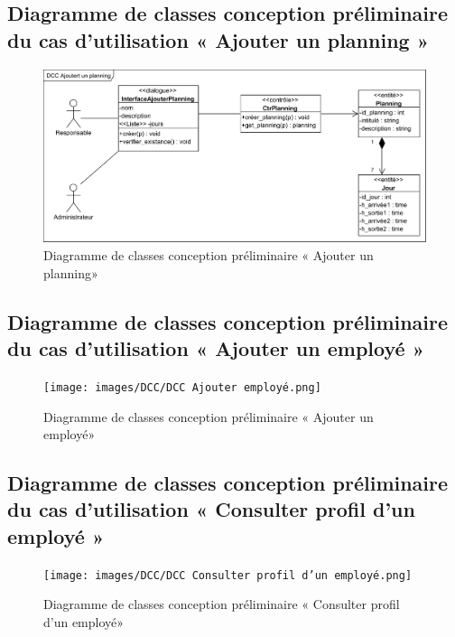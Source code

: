 \begin{itemize}
        \subsection*{Diagramme de classes conception préliminaire du cas d'utilisation « Ajouter un planning »}
        \begin{figure}[h!]
                 \centering
                \includegraphics[scale=0.7]{images/DCC/DCC Ajoutert un planning.png}
                 \caption{Diagramme de classes conception préliminaire « Ajouter un planning»}
                 \label{fig44}
        \end{figure}
        
        \clearpage



        \subsection*{Diagramme de classes conception préliminaire du cas d'utilisation « Ajouter un employé »}
        \begin{figure}[h!]
                 \centering
                \texttt{[image: images/DCC/DCC Ajouter employé.png]}
                 \caption{Diagramme de classes conception préliminaire « Ajouter un employé»}
                 \label{fig45}
        \end{figure}



        \subsection*{Diagramme de classes conception préliminaire du cas d'utilisation « Consulter profil d'un employé »}

        \begin{figure}[h!]
                 \centering
                \texttt{[image: images/DCC/DCC Consulter profil d'un employé.png]}
                 \caption{Diagramme de classes conception préliminaire « Consulter profil d'un employé»}
                 \label{fig46}
        \end{figure}


\end{itemize}
